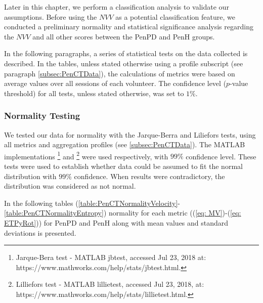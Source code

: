 Later in this chapter, we perform a classification analysis to validate our assumptions. Before using the $NVV$ as a potential classification feature, we conducted a preliminary normality and statistical significance analysis regarding the $NVV$ and all other scores between the \gls{PenPD} and \gls{PenH} groups. 

In the following paragraphs, a series of statistical tests on the data collected is described. In the tables, unless stated otherwise using a profile subscript (see paragraph \ref{subsec:PenCTData}), the calculations of metrics were based on average values over all sessions of each volunteer. The confidence level ($p$-value threshold) for all tests, unless stated otherwise, was set to $1\%$.

\subsubsection{Normality Testing}
\label{subsubsec:PenCTNormalityTesting}
We tested our data for normality with the Jarque-Berra and Liliefors tests, using all metrics and aggregation profiles (see \ref{subsec:PenCTData}). The MATLAB implementations \footnote{Jarque-Bera test - MATLAB jbtest, accessed Jul 23, 2018 at: https://www.mathworks.com/help/stats/jbtest.html.} and \footnote{Lilliefors test - MATLAB lillietest, accessed Jul 23, 2018, at: https://www.mathworks.com/help/stats/lillietest.html.} were used respectively, with $99\%$ confidence level. These tests were used to establish whether data could be assumed to fit the normal distribution with $99\%$ confidence. When results were contradictory, the distribution was considered as not normal. 

In the following tables (\ref{table:PenCTNormalityVelocity}-\ref{table:PenCTNormalityEntropy}) normality for each metric ((\ref{eq: MV})-(\ref{eq: ETPyRot})) for \gls{PenPD} and \gls{PenH} along with mean values and standard deviations is presented.

